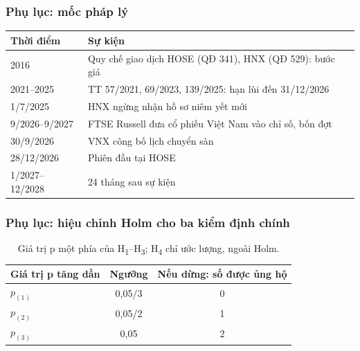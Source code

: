 \documentclass[11pt, xcolor={dvipsnames}, aspectratio=169, usepdftitle=false]{beamer}
\newcommand{\HH}[1]{H\textsubscript{#1}}
\begin{document}
\begin{frame}[label=phapLy]
\frametitle{Phụ lục: mốc pháp lý}
\begin{table}
\begin{tabular*}{\textwidth}{@{\extracolsep\fill}ll}
\toprule
Thời điểm & Sự kiện\\
\midrule
2016 & Quy chế giao dịch HOSE (QĐ 341), HNX (QĐ 529): bước giá\\
2021--2025 & TT 57/2021, 69/2023, 139/2025: hạn lùi đến 31/12/2026\\
1/7/2025 & HNX ngừng nhận hồ sơ niêm yết mới\\
\midrule
9/2026--9/2027 & FTSE Russell đưa cổ phiếu Việt Nam vào chỉ số, bốn đợt\\
30/9/2026 & VNX công bố lịch chuyển sàn\\
28/12/2026 & Phiên đầu tại HOSE\\
1/2027--12/2028 & 24 tháng sau sự kiện\\
\bottomrule
\end{tabular*}
\end{table}
\end{frame}

\begin{frame}[label=holm]
\frametitle{Phụ lục: hiệu chỉnh Holm cho ba kiểm định chính}
\begin{table}
\begin{tabular*}{\textwidth}{@{\extracolsep\fill}lcc}
\toprule
Giá trị p tăng dần & Ngưỡng & Nếu dừng: số được ủng hộ\\
\midrule
$p_{(1)}$ & 0,05/3 & 0\\
$p_{(2)}$ & 0,05/2 & 1\\
$p_{(3)}$ & 0,05 & 2\\
\bottomrule
\end{tabular*}
\caption{Giá trị p một phía của \HH{1}--\HH{3}; \HH{4} chỉ ước lượng, ngoài Holm.}
\end{table}
\end{frame}
\end{document}
